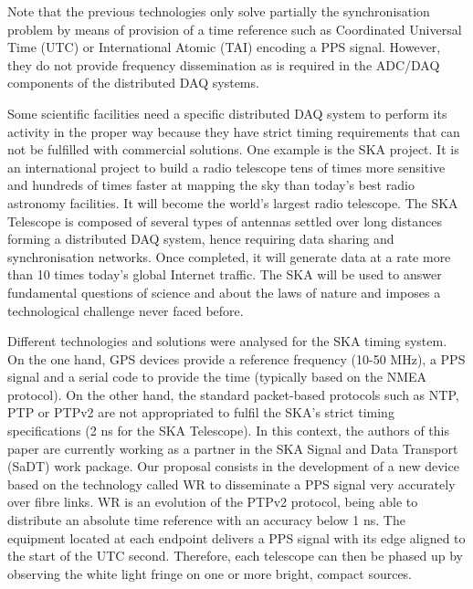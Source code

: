 Note that the previous technologies only solve partially the synchronisation problem by means of provision of a time reference such as Coordinated Universal Time (UTC) or International Atomic (TAI) encoding a PPS signal. However, they do not provide frequency dissemination as is required in the ADC/DAQ components of the distributed DAQ systems.

Some scientific facilities need a specific distributed DAQ system to perform its activity in the proper way because they have strict timing requirements that can not be fulfilled with commercial solutions. One example is the SKA \cite{ska:project_website} project. It is an international project to build a radio telescope tens of times more sensitive and hundreds of times faster at mapping the sky than today's best radio astronomy facilities. It will become the world's largest radio telescope. The SKA Telescope is composed of several types of antennas settled over long distances forming a distributed DAQ system, hence requiring  data sharing and synchronisation networks. Once completed, it will generate data at a rate more than 10 times today's global Internet traffic. The SKA will be used to answer fundamental questions of science and about the laws of nature and imposes a technological challenge never faced before.

Different technologies and solutions were analysed for the SKA timing system. On the one hand, GPS devices provide a reference frequency (10-50 MHz), a PPS signal and a serial code to provide the time (typically based on the NMEA protocol). On the other hand, the standard packet-based protocols such as NTP, PTP or PTPv2 are not appropriated to fulfil the SKA's strict timing specifications (2 ns for the SKA Telescope).
In this context, the authors of this paper are currently working as a partner in the SKA Signal and Data Transport (SaDT) \cite{ska:sadt_website} work package. Our proposal consists in the development of a new device based on the technology called WR \cite{ohwr:wr_wiki} to disseminate a PPS signal very accurately over fibre links. WR is an evolution of the PTPv2 protocol, being able to distribute an absolute time reference with an accuracy below 1 ns. The equipment located at each endpoint delivers a PPS signal with its edge aligned to the start of the UTC second. Therefore, each telescope can then be phased up by observing the white light fringe on one or more bright, compact sources.


